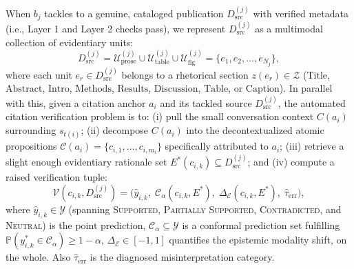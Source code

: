 \documentclass[sigconf]{acmart}
\begin{document}
When $b_j$ tackles to a genuine, cataloged publication $D_{\text{src}}^{(j)}$ with verified metadata (i.e., Layer 1 and Layer 2 checks pass), we represent $D_{\text{src}}^{(j)}$ as a multimodal collection of evidentiary units:
\begin{equation}
D_{\text{src}}^{(j)} = \mathcal{U}_{\text{prose}}^{(j)} \cup \mathcal{U}_{\text{table}}^{(j)} \cup \mathcal{U}_{\text{fig}}^{(j)} = \{e_1, e_2, \dots, e_{N_j}\},
\label{eq:source_units}
\end{equation}
where each unit $e_r \in D_{\text{src}}^{(j)}$ belongs to a rhetorical section $z(e_r) \in \mathcal{Z}$ ($\text{Title}$, $\text{Abstract}$, $\text{Intro}$, $\text{Methods}$, $\text{Results}$, $\text{Discussion}$, $\text{Table}$, or $\text{Caption}$). In parallel with this, given a citation anchor $a_i$ and its tackled source $D_{\text{src}}^{(j)}$, the automated citation verification problem is to: (i) pull the small conversation context $C(a_i)$ surrounding $s_{t(i)}$; (ii) decompose $C(a_i)$ into the decontextualized atomic propositions $\mathcal{C}(a_i) = \{c_{i,1}, \dots, c_{i,m_i}\}$ specifically attributed to $a_i$; (iii) retrieve a slight enough evidentiary rationale set $E^*(c_{i,k}) \subseteq D_{\text{src}}^{(j)}$; and (iv) compute a raised verification tuple:
\begin{equation}
\mathcal{V}(c_{i,k}, D_{\text{src}}^{(j)}) = \Big(\hat{y}_{i,k},\; \mathcal{C}_{\alpha}(c_{i,k}, E^*),\; \Delta_{\mathcal{E}}(c_{i,k}, E^*),\; \hat{\tau}_{\text{err}}\Big),
\label{eq:verification_tuple}
\end{equation}
where $\hat{y}_{i,k} \in \mathcal{Y}$ (spanning \textsc{Supported}, \textsc{Partially Supported}, \textsc{Contradicted}, and \textsc{Neutral}) is the point prediction, $\mathcal{C}_{\alpha} \subseteq \mathcal{Y}$ is a conformal prediction set fulfilling $\mathbb{P}(y^*_{i,k} \in \mathcal{C}_{\alpha}) \geq 1-\alpha$, $\Delta_{\mathcal{E}} \in [-1, 1]$ quantifies the epistemic modality shift, on the whole. Also $\hat{\tau}_{\text{err}}$ is the diagnosed misinterpretation category.
\end{document}

